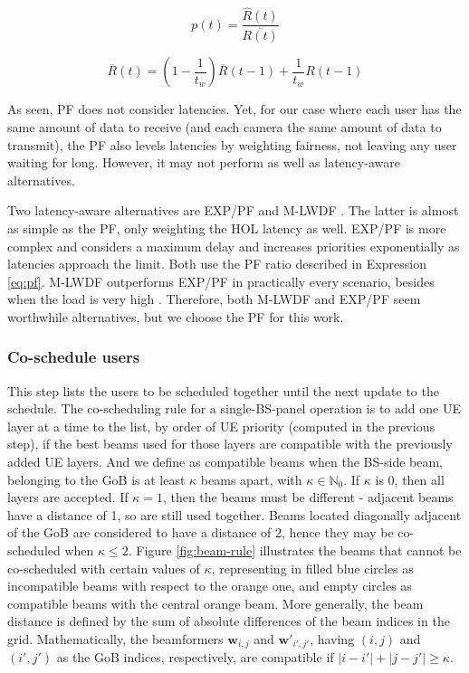 \begin{equation} \label{eq:pf}
    p(t) = \frac{\hat{R}(t)}{\overline{R(t)}}
\end{equation}

\begin{equation} \label{eq:pf2}
    \overline{R}(t) = \left( 1 - \frac{1}{t_w} \right) \overline{R} (t-1) + \frac{1}{t_w} R(t-1)
\end{equation}

As seen, PF does not consider latencies. Yet, for our case where each user has the same amount of data to receive (and each camera the same amount of data to transmit), the PF also levels latencies by weighting fairness, not leaving any user waiting for long. However, it may not perform as well as latency-aware alternatives.

Two latency-aware alternatives are \ac{EXP/PF} \cite{exp_algorithm} and \ac{M-LWDF} \cite{scheduler_performance_eval}. The latter is almost as simple as the PF, only weighting the \ac{HOL} latency as well. \ac{EXP/PF} is more complex and considers a maximum delay and increases priorities exponentially as latencies approach the limit. Both use the PF ratio described in Expression \eqref{eq:pf}. \ac{M-LWDF} outperforms \ac{EXP/PF} in practically every scenario, besides when the load is very high \cite{scheduler_performance_eval}. Therefore, both \ac{M-LWDF} and \ac{EXP/PF} seem worthwhile alternatives, but we choose the PF for this work.

\subsubsection*{Co-schedule users}
This step lists the users to be scheduled together until the next update to the schedule. The co-scheduling rule for a single-BS-panel operation is to add one UE layer at a time to the list, by order of \ac{UE} priority (computed in the previous step), if the best beams used for those layers are compatible with the previously added \ac{UE} layers. And we define as compatible beams when the BS-side beam, belonging to the \ac{GoB} is at least $\kappa$ beams apart, with $\kappa \in \mathbb{N}_0$. If $\kappa$ is 0, then all layers are accepted. If $\kappa = 1$, then the beams must be different - adjacent beams have a distance of 1, so are still used together. Beams located diagonally adjacent of the \ac{GoB} are considered to have a distance of 2, hence they may be co-scheduled when $\kappa \leq 2$. Figure \ref{fig:beam-rule} illustrates the beams that cannot be co-scheduled with certain values of $\kappa$, representing in filled blue circles as incompatible beams with respect to the orange one, and empty circles as compatible beams with the central orange beam. More generally, the beam distance is defined by the sum of absolute differences of the beam indices in the grid. Mathematically, the beamformers $\bm{w}_{i,j}$ and $\bm{w}'_{i',j'}$, having $(i,j)$ and $(i', j')$ as the GoB indices, respectively, are compatible if $|i-i'| + |j - j'| \geq \kappa$.
    
